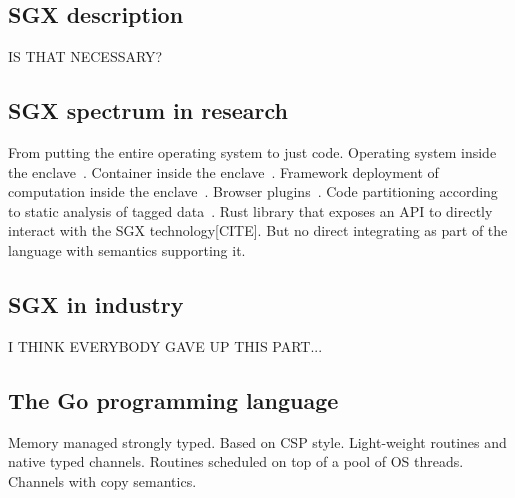 
\subsection{SGX description}

IS THAT NECESSARY?

\subsection{SGX spectrum in research}

From putting the entire operating system to just code.
Operating system inside the enclave~\cite{DBLP:journals/tocs/BaumannPH15}.
Container inside the enclave~\cite{DBLP:conf/osdi/ArnautovTGKMPLM16}.
Framework deployment of computation inside the enclave~\cite{DBLP:conf/sicherheit/UblerGM18}.
Browser plugins~\cite{DBLP:journals/corr/abs-1805-01548}.
Code partitioning according to static analysis of tagged data~\cite{DBLP:conf/osdi/ArnautovTGKMPLM16}.
Rust library that exposes an API to directly interact with the SGX technology[CITE].
But no direct integrating as part of the language with semantics supporting it.

\subsection{SGX in industry}

I THINK EVERYBODY GAVE UP THIS PART...

\subsection{The Go programming language}

Memory managed strongly typed.
Based on CSP style.
Light-weight routines and native typed channels.
Routines scheduled on top of a pool of OS threads.
Channels with copy semantics. 
